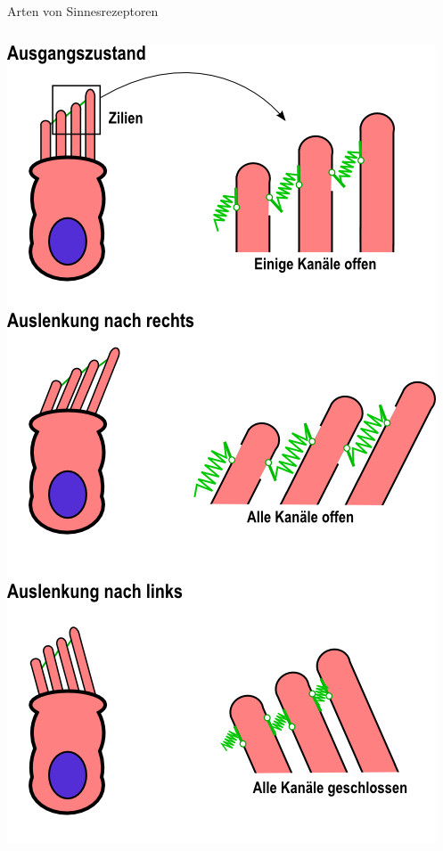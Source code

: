 \documentclass[aspectratio=169]{beamer}
\begin{document}
\begin{frame}{Arten von Sinnesrezeptoren}
\begin{columns}[c]
\begin{column}{4cm}
\includegraphics[width=\textwidth]{Haarzelle.png}
\end{column}


\end{columns}


\end{frame} 
\end{document}
